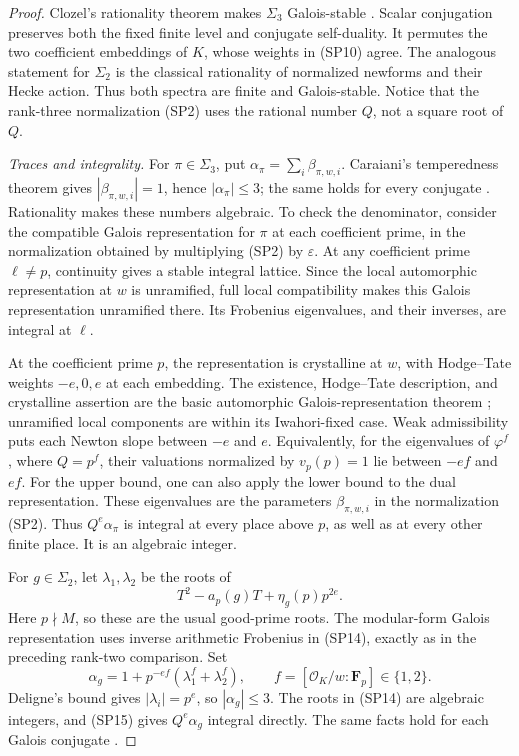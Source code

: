\begin{proof}
Clozel's rationality theorem makes $\Sigma_3$ Galois-stable
\cite[Theorem~3.13]{support-spectrum-Clozel}.
Scalar conjugation preserves both the fixed finite level and
conjugate self-duality.  It permutes the two coefficient
embeddings of $K$, whose weights in (SP10) agree.
The analogous statement for $\Sigma_2$ is the classical
rationality of normalized newforms and their Hecke action.
Thus both spectra are finite and Galois-stable.  Notice that
the rank-three normalization (SP2) uses the rational number
$Q$, not a square root of $Q$.

\emph{Traces and integrality.}
For $\pi\in\Sigma_3$, put
$\alpha_\pi=\sum_i\beta_{\pi,w,i}$.  Caraiani's temperedness
theorem gives $|\beta_{\pi,w,i}|=1$, hence
$|\alpha_\pi|\le3$; the same holds for every conjugate
\cite[Theorem~1.2]{support-spectrum-Caraiani2012}.
Rationality makes these numbers algebraic.  To check the
denominator, consider the compatible Galois representation
for $\pi$ at each coefficient prime, in the normalization
obtained by multiplying (SP2) by $\varepsilon$.
At any coefficient prime $\ell\ne p$, continuity gives a
stable integral lattice.  Since the local automorphic
representation at $w$ is unramified, full local compatibility
makes this Galois representation unramified there.  Its
Frobenius eigenvalues, and their inverses, are integral at $\ell$.

At the coefficient prime $p$, the representation is crystalline
at $w$, with Hodge--Tate weights $-e,0,e$ at each embedding.
The existence, Hodge--Tate description, and crystalline assertion
are the basic automorphic Galois-representation theorem
\cite[Theorem~2.1.1]{support-spectrum-BLGGT}; unramified local
components are within its Iwahori-fixed case.
Weak admissibility puts each Newton slope between $-e$ and $e$.
Equivalently, for the eigenvalues of $\varphi^f$, where
$Q=p^f$, their valuations normalized by $v_p(p)=1$ lie
between $-ef$ and $ef$.  For the upper bound, one can also
apply the lower bound to the dual representation.
These eigenvalues are the parameters $\beta_{\pi,w,i}$ in
the normalization (SP2).  Thus $Q^e\alpha_\pi$ is integral
at every place above $p$, as well as at every other finite
place.  It is an algebraic integer.

For $g\in\Sigma_2$, let $\lambda_1,\lambda_2$ be the roots of
\[
                 T^2-a_p(g)T+\eta_g(p)p^{2e}.                 \tag{SP14}
\]
Here $p\nmid M$, so these are the usual good-prime roots.
The modular-form Galois representation uses inverse arithmetic
Frobenius in (SP14), exactly as in the preceding rank-two
comparison.  Set
\[
       \alpha_g=1+p^{-ef}(\lambda_1^f+\lambda_2^f),
               \qquad f=[\mathcal O_K/w:\mathbf F_p]\in\{1,2\}.
                                                               \tag{SP15}
\]
Deligne's bound gives $|\lambda_i|=p^e$, so
$|\alpha_g|\le3$.  The roots in (SP14) are algebraic
integers, and (SP15) gives $Q^e\alpha_g$ integral directly.
The same facts hold for each Galois conjugate
\cite{support-spectrum-Deligne}.


\end{proof}
